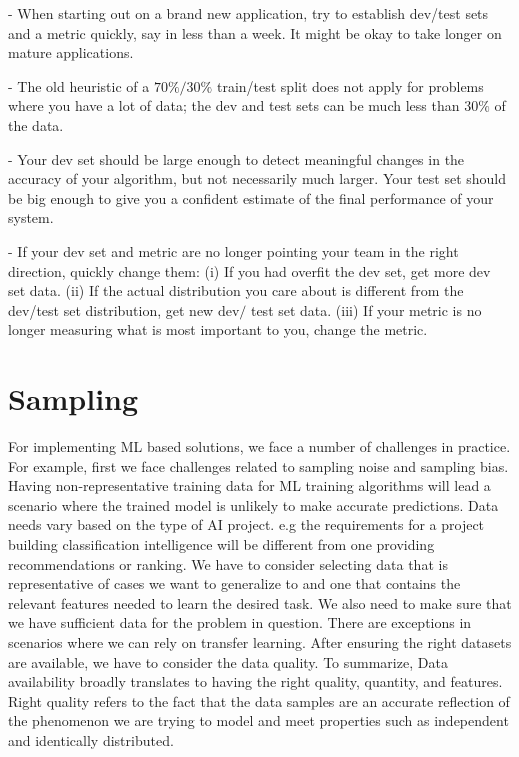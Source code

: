 \documentclass[openany]{book}
\begin{document}
- When starting out on a brand new application, try to establish dev/test sets and a metric quickly, say in less than a week. It might be okay to take longer on mature applications.

- The old heuristic of a $70 \% / 30 \%$ train/test split does not apply for problems where you have a lot of data; the dev and test sets can be much less than $30 \%$ of the data.

- Your dev set should be large enough to detect meaningful changes in the accuracy of your algorithm, but not necessarily much larger. Your test set should be big enough to give you a confident estimate of the final performance of your system.

- If your dev set and metric are no longer pointing your team in the right direction, quickly change them: (i) If you had overfit the dev set, get more dev set data. (ii) If the actual distribution you care about is different from the dev/test set distribution, get new $\mathrm{dev} /$ test set data. (iii) If your metric is no longer measuring what is most important to you, change the metric.





\section{Sampling}
For implementing ML based solutions, we face a number of challenges in practice. For example, first we face challenges related to sampling noise and sampling bias. Having non-representative training data for ML training algorithms will lead a scenario where the trained model is unlikely to make accurate predictions.  Data needs vary based on the type of AI project. e.g the requirements for a project building classification intelligence will be different from one providing recommendations or ranking.  We have to consider selecting data that is representative of cases we want to generalize to and one that contains the relevant features needed to learn the desired task. We also need to make sure that we have sufficient data for the problem in question. There are exceptions in scenarios where we can rely on transfer learning. After ensuring the right datasets are available, we have to consider the data quality. To summarize, Data availability broadly translates to having the right quality, quantity, and features. Right quality refers to the fact that the data samples are an accurate reflection of the phenomenon we are trying to model and meet properties such as independent and identically distributed.
\end{document}
